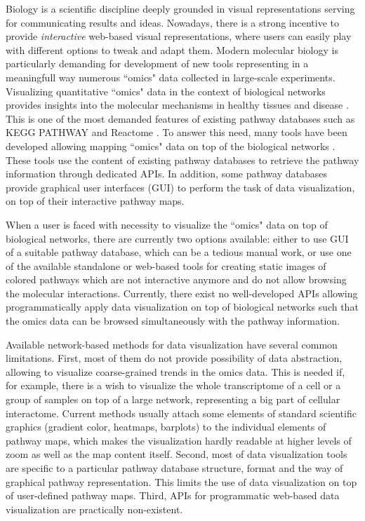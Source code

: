 \documentclass[a4,center,fleqn]{NAR}
\begin{document}
Biology is a scientific discipline deeply grounded in visual representations serving for communicating results and ideas. Nowadays, there is a strong incentive to provide \emph{interactive} web-based visual representations, where users can easily play with different options to tweak and adapt them. Modern molecular biology is particularly demanding for development of new tools representing in a meaningfull way numerous ``omics" data collected in large-scale experiments. Visualizing quantitative ``omics" data in the context of biological networks provides insights into the molecular mechanisms in healthy tissues and disease \cite{Gehlenborg2010,Barillot2012}. This is one of the most demanded features of existing pathway databases such as KEGG PATHWAY and Reactome \cite{Kanehisa2012, Croft2014}. To answer this need, many tools have been developed allowing mapping ``omics" data on top of the biological networks \cite{Arakawa2005,vanIersel2008,Luo2013, Nishida2014}. These tools use the content of existing pathway databases to retrieve the pathway information through dedicated APIs. In addition, some pathway databases provide graphical user interfaces (GUI) to perform the task of data visualization, on top of their interactive pathway maps.

When a user is faced with necessity to visualize the ``omics" data on top of biological networks, there are currently two options available: either to use GUI of a suitable pathway database, which can be a tedious manual work, or use one of the available standalone or web-based tools for creating static images of colored pathways which are not interactive anymore and do not allow browsing the molecular interactions. Currently, there exist no well-developed APIs allowing programmatically apply data visualization on top of biological networks such that the omics data can be browsed simultaneously with the pathway information.

Available network-based methods for data visualization have several common limitations. First, most of them do not provide possibility of data abstraction, allowing to visualize coarse-grained trends in the omics data. This is needed if, for example, there is a wish to visualize the whole transcriptome of a cell or a group of samples on top of a large network, representing a big part of cellular interactome. Current methods usually attach some elements of standard scientific graphics (gradient color, heatmaps, barplots) to the individual elements of pathway maps, which makes the visualization hardly readable at higher levels of zoom as well as the map content itself. Second, most of data visualization tools are specific to a particular pathway database structure, format and the way of graphical pathway representation. This limits the use of data visualization on top of user-defined pathway maps. Third, APIs for programmatic web-based data visualization are practically non-existent.
\end{document}
